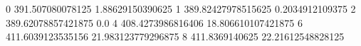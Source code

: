 0 391.507080078125 1.88629150390625
1 389.82427978515625 0.2034912109375
2 389.62078857421875 0.0
4 408.4273986816406 18.806610107421875
6 411.6039123535156 21.983123779296875
8 411.8369140625 22.21612548828125
